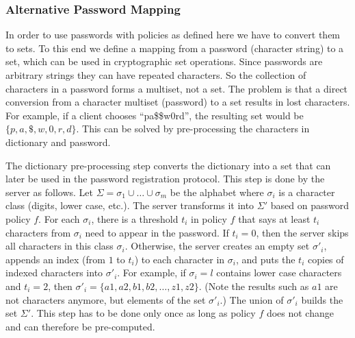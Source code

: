 \subsubsection{Alternative Password Mapping}
In order to use passwords with policies as defined here we have to convert them to sets.
To this end we define a mapping from a password (character string) to a set, which can be used in cryptographic set operations.
Since passwords are arbitrary strings they can have repeated characters. 
So the collection of characters in a password forms a multiset, not a set. 
The problem is that a direct conversion from a character multiset (password) to a set results in lost characters.
For example, if a client chooses ``pa\$\$w0rd'', the resulting set would be $\{p,a,\$,w,0,r,d\}$.
This can be solved by pre-processing the characters in dictionary and password.

The dictionary pre-processing step converts the dictionary into a set that can later be used in the password registration protocol. 
This step is done by the server as follows. 
Let $\Sigma=\sigma_1\cup\dots\cup \sigma_m$ be the alphabet where $\sigma_i$ is a character class (digits, lower case, etc.). 
The server transforms it into $\Sigma'$ based on password policy $f$. 
For each $\sigma_i$, there is a threshold $t_i$ in policy $f$ that says at least $t_i$ characters from $\sigma_i$ need to appear in the password. 
If $t_i = 0$, then the server skips all characters in this class $\sigma_i$. 
Otherwise, the server creates an empty set $\sigma'_i$, appends an index (from $1$ to $t_i$) to each character in $\sigma_i$, and puts the $t_i$ copies of indexed characters into $\sigma'_i$. 
For example, if $\sigma_i=l$ contains lower case characters and $t_i=2$, then $\sigma'_i=\{a1,a2,b1,b2,\ldots,z1,z2\}$. 
(Note the results such as $a1$ are not characters anymore, but elements of the set $\sigma'_i$.)
The union of $\sigma'_i$ builds the set $\Sigma'$.
This step has to be done only once as long as policy $f$ does not change and can therefore be pre-computed.

